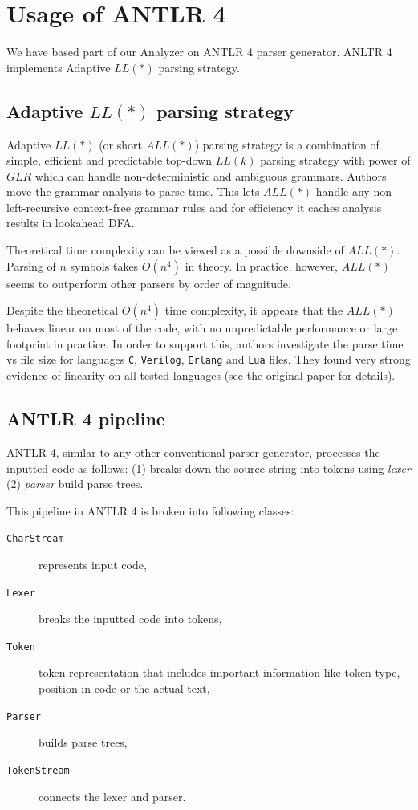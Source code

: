 

\section{Usage of ANTLR 4}
We have based part of our Analyzer on ANTLR 4 parser generator. ANLTR 4 implements Adaptive $LL(*)$ \cite{parr2014adaptive} parsing strategy.

\subsection{Adaptive $LL(*)$ parsing strategy}
Adaptive $LL(*)$ (or short $ALL(*)$) parsing strategy is a combination of simple, efficient and predictable top-down $LL(k)$ parsing strategy with power of $GLR$ which can handle non-deterministic and ambiguous grammars. 
Authors move the grammar analysis to parse-time. This lets $ALL(*)$ handle any non-left-recursive context-free grammar rules and for efficiency it caches analysis results in lookahead DFA.

Theoretical time complexity can be viewed as a possible downside of $ALL(*)$. Parsing of $n$ symbols takes $O(n^4)$ in theory. In practice, however, $ALL(*)$ seems to outperform other parsers by order of magnitude.

Despite the theoretical $O(n^4)$ time complexity, it appears that the $ALL(*)$ behaves linear on most of the code, with no unpredictable performance or large footprint in practice. In order to support this, authors investigate the parse time vs file size for languages \texttt{C}, \texttt{Verilog}, \texttt{Erlang} and \texttt{Lua} files. They found very strong evidence of linearity on all tested languages (see the original paper for details).

\subsection{ANTLR 4 pipeline}

ANTLR 4, similar to any other conventional parser generator, processes the inputted code as follows: (1) breaks down the source string into tokens using \textit{lexer} (2) \textit{parser} build parse trees. 

This pipeline in ANTLR 4 is broken into following classes: 

\begin{description}
	\item[\texttt{CharStream}] represents input code,
	\item[\texttt{Lexer}] breaks the inputted code into tokens,
	\item[\texttt{Token}] token representation that includes important information like token type, position in code or the actual text,
	\item[\texttt{Parser}] builds parse trees,
	\item[\texttt{TokenStream}] connects the lexer and parser.
\end{description}


